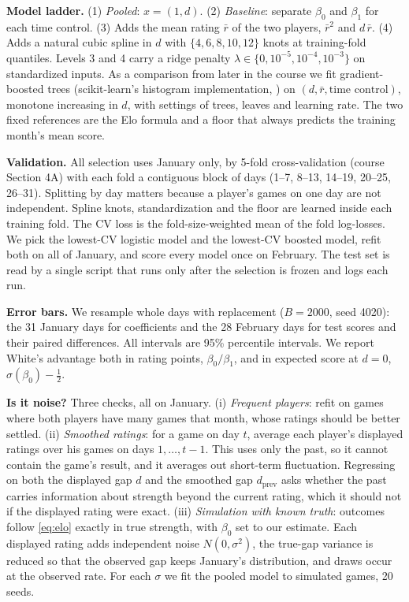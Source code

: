 \documentclass{article}
\begin{document}
\textbf{Model ladder.} (1) \emph{Pooled}: $x = (1, d)$. (2) \emph{Baseline}: separate $\beta_0$ and $\beta_1$ for each time control. (3) Adds the mean rating $\bar r$ of the two players, $\bar r^2$ and $d\,\bar r$. (4) Adds a natural cubic spline in $d$ \citep{hastie2009} with $\{4,6,8,10,12\}$ knots at training-fold quantiles. Levels 3 and 4 carry a ridge penalty $\lambda \in \{0, 10^{-5}, 10^{-4}, 10^{-3}\}$ on standardized inputs. As a comparison from later in the course we fit gradient-boosted trees \citep{friedman2001,ke2017} (scikit-learn's histogram implementation, \citealp{pedregosa2011}) on $(d, \bar r, \text{time control})$, monotone increasing in $d$, with \nGbmConfigs{} settings of trees, leaves and learning rate. The two fixed references are the Elo formula and a floor that always predicts the training month's mean score.

\textbf{Validation.} All selection uses January only, by 5-fold cross-validation (course Section 4A) with each fold a contiguous block of days (1--7, 8--13, 14--19, 20--25, 26--31). Splitting by day matters because a player's games on one day are not independent. Spline knots, standardization and the floor are learned inside each training fold. The CV loss is the fold-size-weighted mean of the fold log-losses. We pick the lowest-CV logistic model and the lowest-CV boosted model, refit both on all of January, and score every model once on February. The test set is read by a single script that runs only after the selection is frozen and logs each run.

\textbf{Error bars.} We resample whole days with replacement \citep{efron1993} ($B = 2000$, seed 4020): the 31 January days for coefficients and the 28 February days for test scores and their paired differences. All intervals are 95\% percentile intervals. We report White's advantage both in rating points, $\beta_0/\beta_1$, and in expected score at $d = 0$, $\sigma(\beta_0) - \tfrac12$.

\textbf{Is it noise?} \label{sec:noise}
Three checks, all on January. (i) \emph{Frequent players}: refit on games where both players have many games that month, whose ratings should be better settled. (ii) \emph{Smoothed ratings}: for a game on day $t$, average each player's displayed ratings over his games on days $1,\dots,t-1$. This uses only the past, so it cannot contain the game's result, and it averages out short-term fluctuation. Regressing on both the displayed gap $d$ and the smoothed gap $d_{\text{prev}}$ asks whether the past carries information about strength beyond the current rating, which it should not if the displayed rating were exact. (iii) \emph{Simulation with known truth}: outcomes follow \eqref{eq:elo} exactly in true strength, with $\beta_0$ set to our estimate. Each displayed rating adds independent noise $N(0, \sigma^2)$, the true-gap variance is reduced so that the observed gap keeps January's distribution, and draws occur at the observed rate. For each $\sigma$ we fit the pooled model to \keptJan{} simulated games, 20 seeds.
\end{document}
